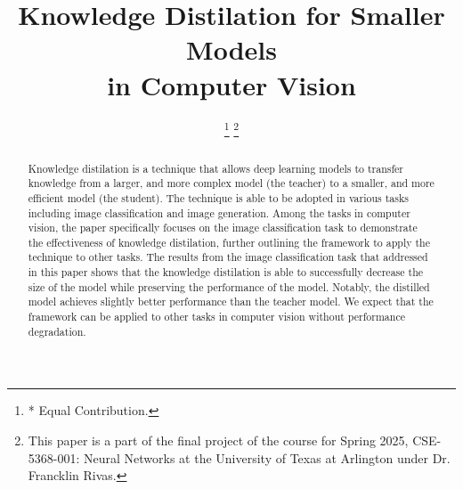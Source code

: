\documentclass[conference]{IEEEtran}
\begin{document}
\title{
    Knowledge Distilation for Smaller Models\\in Computer Vision
}

\author{
\thanks{* Equal Contribution.}
\thanks{This paper is a part of the final project of the course for Spring 2025, CSE-5368-001: Neural Networks at the University of Texas at Arlington under Dr. Francklin Rivas.}
}

\maketitle

\begin{abstract}
    Knowledge distilation is a technique that allows deep learning models
    to transfer knowledge from a larger, and more complex model (the teacher)
    to a smaller, and more efficient model (the student).
    The technique is able to be adopted in various tasks
    including image classification and image generation.
    Among the tasks in computer vision,
    the paper specifically focuses on the image classification task
    to demonstrate the effectiveness of knowledge distilation,
    further outlining the framework to apply the technique to other tasks.
    The results from the image classification task that addressed in this paper
    shows that the knowledge distilation is able to successfully decrease the size of the model
    while preserving the performance of the model.
    Notably, the distilled model achieves slightly better performance than the teacher model.
    We expect that the framework can be applied to other tasks in computer vision without performance degradation.
\end{abstract}
\end{document}
